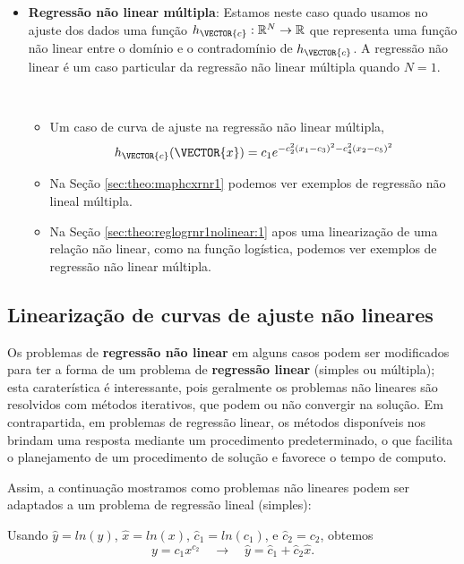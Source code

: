 \begin{itemize}
\item \textbf{Regressão não linear múltipla}: 
Estamos neste caso quado usamos no ajuste dos dados
uma função $h_{\VECTOR{c}}:\mathbb{R}^{N} \rightarrow \mathbb{R}$ 
que representa uma função não linear entre o domínio e o contradomínio de $h_{\VECTOR{c}}$.
A regressão não linear é um caso particular da regressão não linear múltipla quando $N=1$.
\begin{example}~
\begin{itemize}
\item Um caso de curva de ajuste na regressão não linear múltipla, 
\begin{equation}
h_{\VECTOR{c}}(\VECTOR{x})=c_1 e^{- c_2^2(x_1 -c_3)^2- c_4^2(x_2 -c_5)^2}
\end{equation}
\item Na Seção \ref{sec:theo:maphcxrnr1} podemos ver exemplos de regressão não lineal múltipla.
\item Na Seção \ref{sec:theo:reglogrnr1nolinear:1} apos uma linearização de uma relação não linear,
como na função logística, podemos ver exemplos de regressão não linear múltipla.
\end{itemize}
\end{example}
\end{itemize}

\subsection{Linearização de curvas de ajuste não lineares}

Os problemas de \textbf{regressão não linear}
em alguns casos podem ser modificados para ter a forma de um 
problema de \textbf{regressão linear} (simples ou múltipla);
esta caraterística é interessante, pois geralmente
os problemas não lineares são resolvidos com métodos iterativos,
que podem ou não convergir na solução.
Em contrapartida, em problemas de regressão linear,
os métodos disponíveis nos brindam uma resposta mediante um procedimento 
predeterminado, 
o que facilita o planejamento de um procedimento de solução e favorece o tempo de computo.

Assim, a continuação mostramos 
como problemas não lineares podem ser 
adaptados a um problema de regressão lineal (simples):
\begin{example}
Usando 
$\hat{y}=ln(y)$,  
$\hat{x}=ln(x)$, 
$\hat{c}_1=ln(c_1)$, e
$\hat{c}_2=c_2$, obtemos %
\begin{equation}
y=c_1x^{c_2}
\quad \rightarrow \quad 
\hat{y}=\hat{c}_1+\hat{c}_2 \hat{x}.
\end{equation}
\vspace{-2pt}
\end{example}

